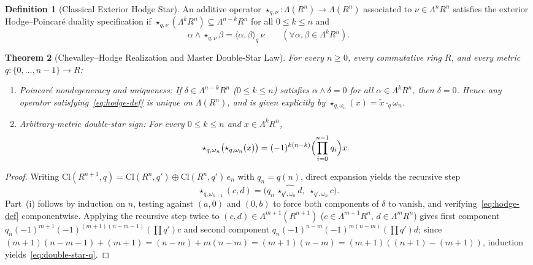 \documentclass[11pt]{article}
\newtheorem{theorem}{Theorem}[section]
\theoremstyle{definition}
\newtheorem{definition}[theorem]{Definition}
\newcommand{\Cl}{\mathrm{Cl}}
\begin{document}
\begin{definition}[Classical Exterior Hodge Star]\label{def:hodge}
An additive operator $\star_{q,\nu} : \Lambda(R^n) \to \Lambda(R^n)$ associated to $\nu \in \Lambda^n R^n$ satisfies the exterior Hodge--Poincar\'e duality specification if $\star_{q,\nu}(\Lambda^k R^n) \subseteq \Lambda^{n-k} R^n$ for all $0 \le k \le n$ and
\begin{equation}\label{eq:hodge-def}
\alpha \wedge \star_{q,\nu}\beta = \langle \alpha, \beta \rangle_q\,\nu
\qquad (\forall \alpha, \beta \in \Lambda^k R^n).
\end{equation}
\end{definition}

\begin{theorem}[Chevalley--Hodge Realization and Master Double-Star Law]\label{thm:double-star}
For every $n \ge 0$, every commutative ring $R$, and every metric $q : \{0, \dots, n-1\} \to R$:
\begin{enumerate}
\item \emph{Poincar\'e nondegeneracy and uniqueness:} If $\delta \in \Lambda^{n-k} R^n$ ($0 \le k \le n$) satisfies $\alpha \wedge \delta = 0$ for all $\alpha \in \Lambda^k R^n$, then $\delta = 0$. Hence any operator satisfying~\eqref{eq:hodge-def} is unique on $\Lambda(R^n)$, and is given explicitly by $\star_{q,\omega_n}(x) = \widetilde{x} \cdot_q \omega_n$.
\item \emph{Arbitrary-metric double-star sign:} For every $0 \le k \le n$ and $x \in \Lambda^k R^n$,
\begin{equation}\label{eq:double-star-q}
\star_{q,\omega_n}\bigl(\star_{q,\omega_n}(x)\bigr)
= (-1)^{k(n-k)} \Bigl(\prod_{i=0}^{n-1} q_i\Bigr) x.
\end{equation}
\end{enumerate}
\end{theorem}
\begin{proof}
Writing $\Cl(R^{n+1}, q) = \Cl(R^n, q') \oplus \Cl(R^n, q')\,e_n$ with $q_n = q(n)$, direct expansion yields the recursive step
\[
\star_{q,\omega_{n+1}}(c, d) = \bigl(q_n\,\widehat{\star_{q',\omega_n} d},\; \star_{q',\omega_n} c\bigr).
\]
Part~(i) follows by induction on $n$, testing against $(a, 0)$ and $(0, b)$ to force both components of $\delta$ to vanish, and verifying~\eqref{eq:hodge-def} componentwise. Applying the recursive step twice to $(c, d) \in \Lambda^{m+1}(R^{n+1})$ ($c \in \Lambda^{m+1} R^n$, $d \in \Lambda^m R^n$) gives first component $q_n (-1)^{m+1} (-1)^{(m+1)(n-m-1)} (\prod q') c$ and second component $q_n (-1)^{n-m} (-1)^{m(n-m)} (\prod q') d$; since $(m+1)(n-m-1) + (m+1) = (n-m) + m(n-m) = (m+1)(n-m) = (m+1)((n+1)-(m+1))$, induction yields~\eqref{eq:double-star-q}.
\end{proof}
\end{document}
